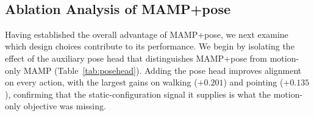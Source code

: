 \documentclass[letterpaper]{article} %
\begin{document}
\begin{table}[htbp]
\centering
\setlength{\tabcolsep}{2pt}
\small
\caption{Raw MAMP+pose performance versus geometric and learned baselines ($n=25$, mean $\pm$ SE).
Bold: best (highest mean) in each column. $^{*}$: significantly higher than every baseline
(Wilcoxon with Holm correction, $p<.05$).}
~\label{tab:baselines}
\end{table}





\subsection{Ablation Analysis of MAMP+pose}

\label{sec:ablation}
Having established the overall advantage of MAMP+pose, we next examine which design choices contribute to its performance. We begin by isolating the effect of the auxiliary pose head that distinguishes MAMP+pose from motion-only MAMP (Table~\ref{tab:posehead}). Adding the pose head improves alignment on every action, with the largest gains on walking
($+0.201$) and pointing ($+0.135$), confirming that the static-configuration signal it supplies is
what the motion-only objective was missing.
\end{document}
